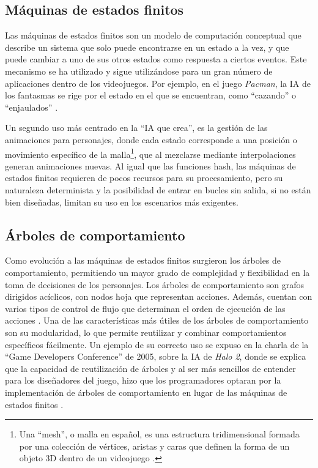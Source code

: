 \subsection{Máquinas de estados finitos}

Las máquinas de estados finitos son un modelo de computación conceptual que describe un sistema que solo puede encontrarse en un estado a la vez, y que puede cambiar a uno de sus otros estados como respuesta a ciertos eventos. Este mecanismo se ha utilizado y sigue utilizándose para un gran número de aplicaciones dentro de los videojuegos. Por ejemplo, en el juego \textit{Pac\-man}, la IA de los fantasmas se rige por el estado en el que se encuentran, como ``cazando'' o ``enjaulados'' \cite{mike_game_2016}.

Un segundo uso más centrado en la ``IA que crea'', es la gestión de las animaciones para personajes, donde cada estado corresponde a una posición o movimiento específico de la malla\footnote{Una ``mesh'', o malla en español, es una estructura tridimensional formada por una colección de vértices, aristas y caras que definen la forma de un objeto 3D dentro de un videojuego \cite{universidad_europea_que_2025}.}, que al mezclarse mediante interpolaciones generan animaciones nuevas. Al igual que las funciones hash, las máquinas de estados finitos requieren de pocos recursos para su procesamiento, pero su naturaleza determinista y la posibilidad de entrar en bucles sin salida, si no están bien diseñadas, limitan su uso en los escenarios más exigentes.

\subsection{Árboles de comportamiento}

Como evolución a las máquinas de estados finitos surgieron los árboles de comportamiento, permitiendo un mayor grado de complejidad y flexibilidad en la toma de decisiones de los personajes. Los árboles de comportamiento son grafos dirigidos acíclicos, con nodos hoja que representan acciones. Además, cuentan con varios tipos de control de flujo que determinan el orden de ejecución de las acciones \cite{epic_games_behavior_2024}. Una de las características más útiles de los árboles de comportamiento son su modularidad, lo que permite reutilizar y combinar comportamientos específicos fácilmente. Un ejemplo de su correcto uso se expuso en la charla de la ``Game Developers Conference'' de 2005, sobre la IA de \textit{Halo 2}, donde se explica que la capacidad de reutilización de árboles y al ser más sencillos de entender para los diseñadores del juego, hizo que los programadores optaran por la implementación de árboles de comportamiento en lugar de las máquinas de estados finitos \cite{isla_managing_2005}.


